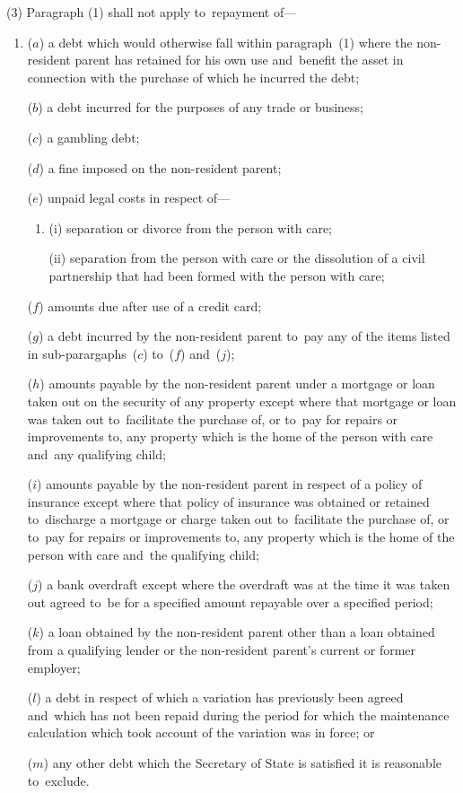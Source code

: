 \documentclass[12pt,a4paper]{article}
\begin{document}
(3) Paragraph (1) shall not apply to~repayment of—
\begin{enumerate}\item[]
($a$) a debt which would otherwise fall within paragraph~(1) where the non-resident parent has retained for his own use and~benefit the asset in connection with the purchase of which he incurred the debt;

($b$) a debt incurred for the purposes of any trade or business;

($c$) a gambling debt;

($d$) a fine imposed on the non-resident parent;


($e$) unpaid legal costs in respect of—
\begin{enumerate}\item[]
(i) separation or divorce from the person with care;

(ii) separation from the person with care or the dissolution of a civil partnership that had been formed with the person with care;
\end{enumerate}

($f$) amounts due after use of a credit card;

($g$) a debt incurred by the non-resident parent to~pay any of the items listed in sub-parargaphs~($c$)  to~($f$)  and~($j$);

($h$) amounts payable by the non-resident parent under a mortgage or loan taken out on the security of any property except where that mortgage or loan was taken out to~facilitate the purchase of, or to~pay for repairs or improvements to, any property which is the home of the person with care and~any qualifying child;

($i$) amounts payable by the non-resident parent in respect of a policy of insurance except where that policy of insurance was obtained or retained to~discharge a mortgage or charge taken out to~facilitate the purchase of, or to~pay for repairs or improvements to, any property which is the home of the person with care and~the qualifying child;

($j$) a bank overdraft except where the overdraft was at the time it was taken out agreed to~be for a specified amount repayable over a specified period;

($k$) a loan obtained by the non-resident parent other than a loan obtained from a qualifying lender or the non-resident parent’s current or former employer;

($l$) a debt in respect of which a variation has previously been agreed and~which has not been repaid during the period for which the maintenance calculation which took account of the variation was in force; or

($m$) any other debt which the Secretary of State is satisfied it is reasonable to~exclude.
\end{enumerate}
\end{document}
